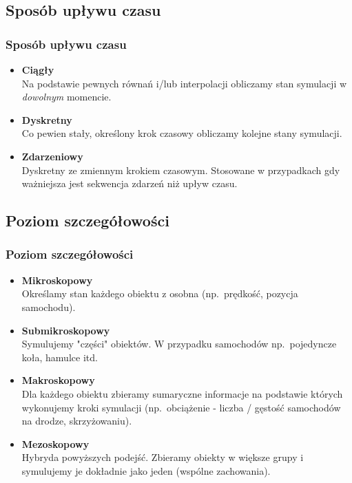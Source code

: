 \documentclass[slidestop, compress, 10pt]{beamer}
\begin{document}
    \subsection{Sposób upływu czasu}
        \begin{frame}
            \frametitle{Sposób upływu czasu}
            \begin{itemize}
                \item<2-> \textbf{Ciągły} \\
                    Na podstawie pewnych równań i/lub interpolacji obliczamy stan symulacji w \textit{dowolnym} momencie.

                \item<3-> \textbf{Dyskretny} \\
                    Co pewien stały, określony krok czasowy obliczamy kolejne stany symulacji.

                \item<4-> \textbf{Zdarzeniowy} \\
                    Dyskretny ze zmiennym krokiem czasowym. Stosowane w przypadkach gdy ważniejsza jest sekwencja zdarzeń niż upływ czasu.
            \end{itemize}
        \end{frame}

    \subsection{Poziom szczegółowości}
        \begin{frame}
            \frametitle{Poziom szczegółowości}
            \begin{itemize}
                \item<2-> \textbf{Mikroskopowy} \\
                    Określamy stan każdego obiektu z osobna (np.\ prędkość, pozycja samochodu).

                \item<3-> \textbf{Submikroskopowy} \\
                    Symulujemy "części" obiektów. W przypadku samochodów np.\ pojedyncze koła, hamulce itd.

                \item<4-> \textbf{Makroskopowy} \\
                    Dla każdego obiektu zbieramy sumaryczne informacje na podstawie których wykonujemy kroki symulacji (np.\ obciążenie - liczba / gęstość samochodów na drodze, skrzyżowaniu).

                \item<5-> \textbf{Mezoskopowy} \\
                    Hybryda powyższych podejść. Zbieramy obiekty w większe grupy i symulujemy je dokładnie jako jeden (wspólne zachowania).
            \end{itemize}
    \end{frame}
\end{document}
